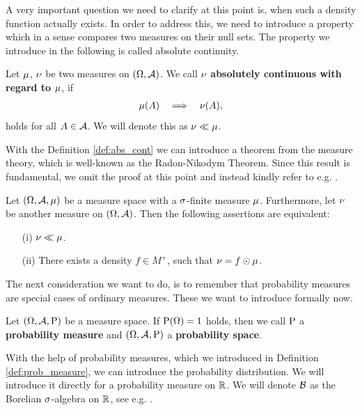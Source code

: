 A very important question we need to clarify at this point is, when such a density function actually exists. In order to address this, we need to introduce a property which in a sense compares two measures on their null sets. The property we introduce in the following is called absolute continuity.

\begin{definition}\label{def:abs_cont}
Let $\operatorname{\mu}$, $\operatorname{\nu}$ be two measures on $(\Omega, \operatorname{\mathcal{A}})$. We call $\operatorname{\nu}$ \textbf{absolutely continuous with regard to $\operatorname{\mu}$}, if
\begin{align*}
\operatorname{\mu}(A) \quad \Longrightarrow \quad \operatorname{\nu}(A),
\end{align*}
holds for all $A\in\operatorname{\mathcal{A}}$. We will denote this as $\operatorname{\nu} \ll \operatorname{\mu}$.
\end{definition}

With the Definition \ref{def:abs_cont} we can introduce a theorem from the measure theory, which is well-known as the Radon-Nikodym Theorem. Since this result is fundamental, we omit the proof at this point and instead kindly refer to e.g. \cite[Theorem~2.38]{meintrup2006stochastik}.

\begin{theorem}\label{theoreom:radon-nikodym}
Let $(\Omega, \operatorname{\mathcal{A}}, \operatorname{\mu})$ be a measure space with a $\operatorname{\sigma}$-finite measure $\operatorname{\mu}$. Furthermore, let $\operatorname{\nu}$ be another measure on $(\Omega, \operatorname{\mathcal{A}})$. Then the following assertions are equivalent:
\begin{enumerate}
\item[(i)] $\operatorname{\nu} \ll \operatorname{\mu}$.
\item[(ii)] There exists a density $f\in M^{+}$, such that $\operatorname{\nu} = f \odot \operatorname{\mu}$.
\end{enumerate}
\end{theorem}

The next consideration we want to do, is to remember that probability measures are special cases of ordinary measures. These we want to introduce formally now.

\begin{definition}\label{def:prob_measure}
Let $(\Omega, \operatorname{\mathcal{A}}, \operatorname{\text{P}})$ be a measure space. If $\operatorname{\text{P}}(\Omega) = 1$ holds, then we call $\operatorname{\text{P}}$ a \textbf{probability measure} and $(\Omega, \operatorname{\mathcal{A}}, \operatorname{\text{P}})$ a \textbf{probability space}.
\end{definition}

With the help of probability measures, which we introduced in Definition \ref{def:prob_measure}, we can introduce the probability distribution. We will introduce it directly for a probability measure on $\operatorname{\mathbb{R}}$. We will denote $\operatorname{\mathcal{B}}$ as the Borelian $\operatorname{\sigma}$-algebra on $\operatorname{\mathbb{R}}$, see e.g. \cite[Definition~1.13]{meintrup2006stochastik}.

